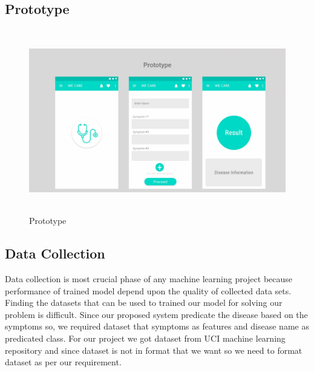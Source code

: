 \subsection{Prototype}
\begin{figure}[H]
\begin{center}
\includegraphics[width=150mm, height = 80mm]{images/prototype.jpg}
\caption{Prototype}
\end{center}
\end{figure}

\subsection{Data Collection}
Data collection is most crucial phase of any machine learning project because performance of trained model depend upon the quality of collected data sets. Finding the datasets that can be used to trained our model for solving our problem is difficult. Since our proposed system predicate the disease based on the symptoms so, we required dataset that symptoms as features and disease name as predicated class. For our project we got dataset from UCI machine learning repository and since dataset is not in format that we want so we need to format dataset as per our requirement.



